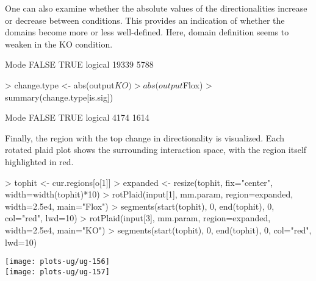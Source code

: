 \documentclass[12pt]{report}
\renewenvironment{Schunk}{\vspace{0pt}}{\vspace{0pt}}
\begin{document}
One can also examine whether the absolute values of the directionalities increase or decrease between conditions.
This provides an indication of whether the domains become more or less well-defined.
Here, domain definition seems to weaken in the KO condition.

\begin{Schunk}
\begin{Soutput}
   Mode   FALSE    TRUE 
logical   19339    5788 
\end{Soutput}
\begin{Sinput}
> change.type <- abs(output$KO) > abs(output$Flox)
> summary(change.type[is.sig])
\end{Sinput}
\begin{Soutput}
   Mode   FALSE    TRUE 
logical    4174    1614 
\end{Soutput}
\end{Schunk}

Finally, the region with the top change in directionality is visualized.
Each rotated plaid plot shows the surrounding interaction space, with the region itself highlighted in red.





\begin{Schunk}
\begin{Sinput}
> tophit <- cur.regions[o[1]]
> expanded <- resize(tophit, fix="center", width=width(tophit)*10)
> rotPlaid(input[1], mm.param, region=expanded, width=2.5e4, main="Flox")
> segments(start(tophit), 0, end(tophit), 0, col="red", lwd=10)
> rotPlaid(input[3], mm.param, region=expanded, width=2.5e4, main="KO")
> segments(start(tophit), 0, end(tophit), 0, col="red", lwd=10)
\end{Sinput}
\end{Schunk}

\begin{center}
\texttt{[image: plots-ug/ug-156]}
\\
\texttt{[image: plots-ug/ug-157]}
\end{center}

\end{document}
